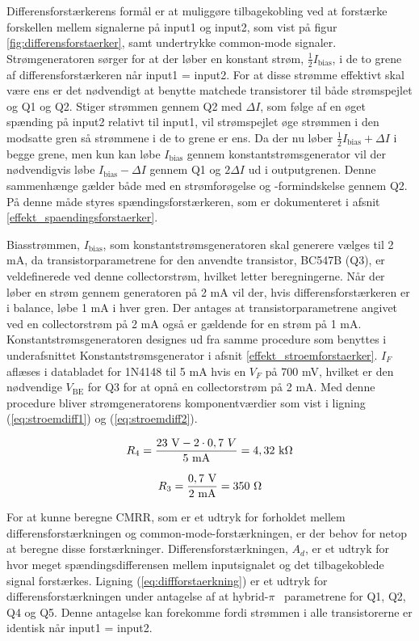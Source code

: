 Differensforstærkerens formål er at muliggøre tilbagekobling ved at forstærke forskellen mellem signalerne på input1 og input2, som vist på figur \ref{fig:differensforstaerker}, samt undertrykke common-mode signaler. Strømgeneratoren sørger for at der løber en konstant strøm, $\frac{1}{2}I_\mathrm{bias}$, i de to grene af differensforstærkeren når input1 = input2. For at disse strømme effektivt skal være ens er det nødvendigt at benytte matchede transistorer til både strømspejlet og Q1 og Q2. Stiger strømmen gennem Q2 med $\Delta I$, som følge af en øget spænding på input2 relativt til input1, vil strømspejlet øge strømmen i den modsatte gren så strømmene i de to grene er ens. Da der nu løber $\frac{1}{2}I_\mathrm{bias} + \Delta I$ i begge grene, men kun kan løbe $I_\mathrm{bias}$ gennem konstantstrømsgenerator vil der nødvendigvis løbe $I_\mathrm{bias} -\Delta I$ gennem Q1 og $2\Delta I$ ud i outputgrenen. Denne sammenhænge gælder både med en strømforøgelse og -formindskelse gennem Q2. På denne måde styres spændingsforstærkeren, som er dokumenteret i afsnit \ref{effekt_spaendingsforstaerker}. 

Biasstrømmen, $I_\mathrm{bias}$, som konstantstrømsgeneratoren skal generere vælges til 2 mA, da transistorparametrene for den anvendte transistor, BC547B (Q3), er veldefinerede ved denne collectorstrøm, hvilket letter beregningerne. Når der løber en strøm gennem generatoren på 2 mA vil der, hvis differensforstærkeren er i balance, løbe 1 mA i hver gren. Der antages at transistorparametrene angivet ved en collectorstrøm på 2 mA også er gældende for en strøm på 1 mA. 
Konstantstrømsgeneratoren designes ud fra samme procedure som benyttes i underafsnittet Konstantstrømsgenerator i afsnit \ref{effekt_stroemforstaerker}. $I_F$ aflæses i databladet for 1N4148 til 5 mA hvis en $V_F$ på 700 mV, hvilket er den nødvendige $V_\mathrm{BE}$ for Q3 for at opnå en collectorstrøm på 2 mA. Med denne procedure bliver strømgeneratorens komponentværdier som vist i ligning (\ref{eq:stroemdiff1}) og (\ref{eq:stroemdiff2}).

\begin{equation}
\label{eq:stroemdiff1}
R_4=\frac{23~\mathrm{V}-2 \cdot 0,7~V}{5~\mathrm{mA}}=4,32~\mathrm{k}\ohm
\end{equation}

\begin{equation}
\label{eq:stroemdiff2}
R_3=\frac{0,7~\mathrm{V}}{2~\mathrm{mA}}=350~\ohm
\end{equation}

For at kunne beregne CMRR, som er et udtryk for forholdet mellem differensforstærkningen og common-mode-forstærkningen, er der behov for netop at beregne disse forstærkninger. 
Differensforstærkningen, $A_d$, er et udtryk for hvor meget spændingsdifferensen mellem inputsignalet og det tilbagekoblede signal forstærkes. Ligning (\ref{eq:diffforstaerkning}) \cite{sedra-smith-2} %
er et udtryk for differensforstærkningen under antagelse af at hybrid-$\pi$~ parametrene for Q1, Q2, Q4 og Q5. Denne antagelse kan forekomme fordi strømmen i alle transistorerne er identisk når input1 = input2.

